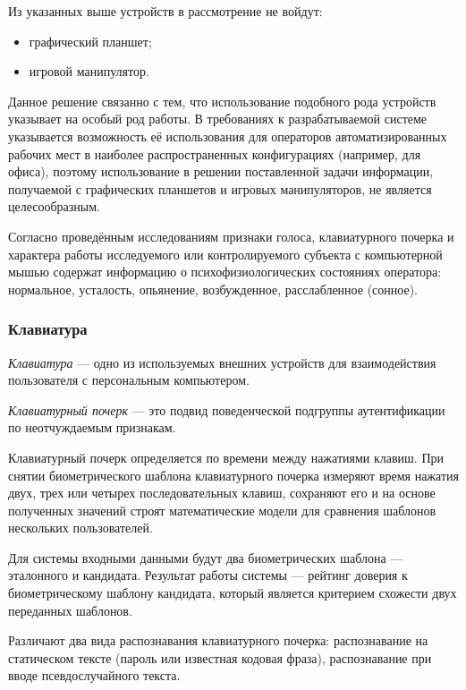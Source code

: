 Из указанных выше устройств в рассмотрение не войдут:
\begin{itemize}[leftmargin=1.6\parindent]
\item графический планшет;
\item игровой манипулятор.
\end{itemize}

Данное решение связанно с тем, что использование подобного рода устройств указывает на особый род работы. В требованиях к разрабатываемой системе указывается возможность её использования для операторов автоматизированных рабочих мест в наиболее распространенных  конфигурациях (например, для офиса), поэтому использование в решении поставленной задачи информации, получаемой с графических планшетов и игровых манипуляторов, не является целесообразным.

Согласно проведённым исследованиям \cite{recognitionOfPsycho} признаки голоса, клавиатурного почерка и характера работы исследуемого или контролируемого субъекта с компьютерной мышью содержат информацию о психофизиологических состояниях оператора: нормальное, усталость, опьянение, возбужденное, расслабленное (сонное).

\subsubsection{Клавиатура}
\textit{Клавиатура} --- одно из используемых внешних устройств для взаимодействия пользователя с персональным компьютером.

\textit{Клавиатурный почерк} --- это подвид поведенческой подгруппы аутентификации по неотчуждаемым признакам. \cite{keystroke}

Клавиатурный почерк определяется по времени между нажатиями клавиш. При снятии биометрического шаблона клавиатурного почерка измеряют время нажатия двух, трех или четырех последовательных клавиш, сохраняют его и на основе полученных значений строят математические модели для сравнения шаблонов нескольких пользователей. \cite{intrusionDetection}

 Для системы входными данными будут два биометрических шаблона --- эталонного и кандидата. Результат работы системы --- рейтинг доверия к биометрическому шаблону кандидата, который является критерием схожести двух переданных шаблонов.

Различают два вида распознавания клавиатурного почерка: распознавание на статическом тексте (пароль или известная кодовая фраза), распознавание при вводе псевдослучайного текста. \cite{keystroke}

